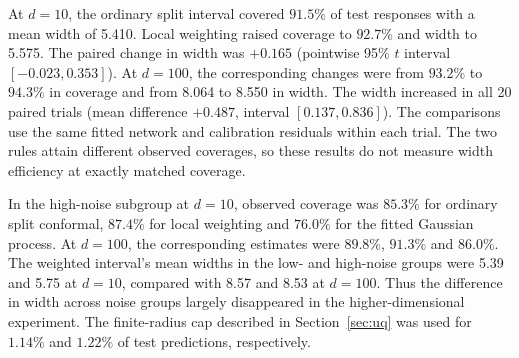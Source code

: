 At $d=10$, the ordinary split interval covered $91.5\%$ of test responses with a mean width of 5.410. Local weighting raised coverage to $92.7\%$ and width to 5.575. The paired change in width was $+0.165$ (pointwise 95\% $t$ interval $[-0.023,0.353]$). At $d=100$, the corresponding changes were from $93.2\%$ to $94.3\%$ in coverage and from 8.064 to 8.550 in width. The width increased in all 20 paired trials (mean difference $+0.487$, interval $[0.137,0.836]$). The comparisons use the same fitted network and calibration residuals within each trial. The two rules attain different observed coverages, so these results do not measure width efficiency at exactly matched coverage.

In the high-noise subgroup at $d=10$, observed coverage was $85.3\%$ for ordinary split conformal, $87.4\%$ for local weighting and $76.0\%$ for the fitted Gaussian process. At $d=100$, the corresponding estimates were $89.8\%$, $91.3\%$ and $86.0\%$. The weighted interval's mean widths in the low- and high-noise groups were 5.39 and 5.75 at $d=10$, compared with 8.57 and 8.53 at $d=100$. Thus the difference in width across noise groups largely disappeared in the higher-dimensional experiment. The finite-radius cap described in Section~\ref{sec:uq} was used for $1.14\%$ and $1.22\%$ of test predictions, respectively.
